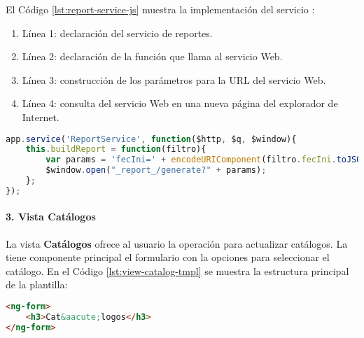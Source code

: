 El Código \ref{lst:report-service-js} muestra la implementación del servicio :
\begin{enumerate}
	\item Línea 1: declaración del servicio de reportes.
	\item Línea 2: declaración de la función que llama al servicio Web.
	\item Línea 3: construcción de los parámetros para la URL del servicio Web.
	\item Línea 4: consulta del servicio Web en una nueva página del explorador de Internet.
\end{enumerate}
\begin{lstlisting}[language=Javascript, caption={Servicio en AngularJS para pedir la generación de un reporte.}, captionpos=b, label={lst:report-service-js}]
app.service('ReportService', function($http, $q, $window){
	this.buildReport = function(filtro){
		var params = 'fecIni=' + encodeURIComponent(filtro.fecIni.toJSON()) + "&" + 'fecFin=' + encodeURIComponent(filtro.fecFin.toJSON()) + "&" + 'horIni=' + encodeURIComponent(filtro.horIni.toJSON()) + "&" + 'horFin=' + encodeURIComponent(filtro.horFin.toJSON()) + "&" + 'reporte=' + encodeURIComponent(filtro.reporte.key);
		$window.open("_report_/generate?" + params);
	};
});
\end{lstlisting}

\paragraph{3. Vista Catálogos\\}
La vista \textbf{Catálogos} ofrece al usuario la operación para actualizar catálogos. La tiene componente principal el formulario con la opciones para seleccionar el catálogo. En el Código \ref{lst:view-catalog-tmpl} se muestra la estructura principal de la plantilla:\\
\begin{lstlisting}[language=HTML, captionpos=b, caption={Plantilla de la vista que muestra los catálogos.}, label={lst:view-catalog-tmpl}]
<ng-form>
	<h3>Cat&aacute;logos</h3>
</ng-form>
\end{lstlisting}

